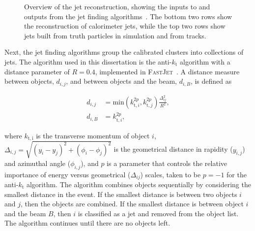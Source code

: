 \begin{figure}[htbp]
	\centering
	\caption[Overview of the jet reconstruction, showing the inputs to and outputs from the jet finding algorithms. The bottom two rows show the reconstruction of calorimeter jets, while the top two rows show jets built from truth particles in simulation and from tracks.]{Overview of the jet reconstruction, showing the inputs to and outputs from the jet finding algorithms~\cite{TheATLASCollaboration:2015ds}. The bottom two rows show the reconstruction of calorimeter jets, while the top two rows show jets built from truth particles in simulation and from tracks.}
	\label{fig:reco-jet-reconstruction-flowchart}
\end{figure}


Next, the jet finding algorithms group the calibrated clusters into collections of jets. The algorithm used in this dissertation is the anti-$k_{\mathrm{t}}$ algorithm with a distance parameter of $R=0.4$, implemented in \textsc{FastJet}~\cite{Cacciari:2008gp,Cacciari:2011ma}. A distance measure between objects, $d_{i,j}$, and between objects and the beam, $d_{i,B}$, is defined as

\begin{align}
	d_{i,j} &= \mathrm{min}(k_{\mathrm{t}, i}^{2p}, k_{\mathrm{t}, j}^{2p}) \frac{\Delta_{ij}^2}{R^2}, \\
	d_{i,B} &= k_{\mathrm{t},i}^{2p},
\end{align}

where $k_{\mathrm{t,i}}$ is the transverse momentum of object $i$, $\Delta_{i,j}=\sqrt{(y_i-y_j)^2+(\phi_i-\phi_j)^2}$ is the geometrical distance in rapidity ($y_{i,j}$) and azimuthal angle ($\phi_{i,j}$), and $p$ is a parameter that controls the relative importance of energy versus geometrical ($\Delta_{ij}$) scales, taken to be $p=-1$ for the anti-$k_{\mathrm{t}}$ algorithm. The algorithm combines objects sequentially by considering the smallest distance in the event. If the smallest distance is between two objects $i$ and $j$, then the objects are combined. If the smallest distance is between object $i$ and the beam $B$, then $i$ is classified as a jet and removed from the object list. The algorithm continues until there are no objects left. 

